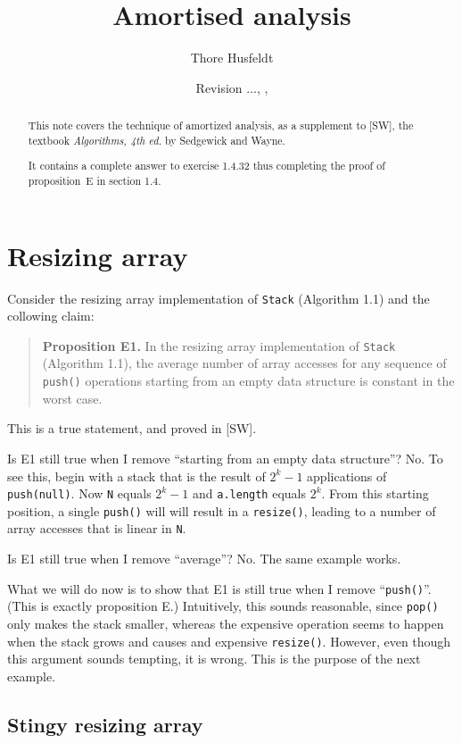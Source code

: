 \documentclass{tufte-handout}
\title{Amortised analysis}
\author{Thore Husfeldt}
\date{\small Revision {\tt \GITAbrHash}$\ldots$, \GITAuthorDate, \GITAuthorName}
\begin{document}
\maketitle
\begin{abstract}
  This note covers the technique of amortized analysis, as a
  supplement to [SW], the textbook \emph{Algorithms, 4th ed.} by
  Sedgewick and Wayne.

  It contains a complete answer to exercise 1.4.32 thus completing the
  proof of proposition~E in section 1.4.
\end{abstract}

\section{Resizing array}
\label{sec-1.1}

Consider the resizing array implementation of {\tt Stack} (Algorithm
1.1) and the collowing claim:

   
\begin{quote} {\bf Proposition E1.} In the resizing array
  implementation of {\tt Stack} (Algorithm 1.1), the average number of
  array accesses for any sequence of {\tt push()} operations starting
  from an empty data structure is constant in the worst case.
\end{quote}

This is a true statement, and proved in [SW].

Is E1 still true when I remove ``starting from an empty data
structure''?
No.
To see this, begin with a stack that is the result of $2^k-1$
applications of {\tt push(null)}. 
Now {\tt N} equals $2^k-1$ and {\tt  a.length} equals $2^k$. 
From this starting position, a single {\tt push()} will will result in
a {\tt resize()}, leading to a  number of array accesses that is
linear in {\tt N}.
   
Is E1 still true when I remove ``average''?
No.
The same example works.
   
What we will do now is to show that E1 is still true when I remove
``{\tt push()}''. 
(This is exactly proposition E.)
Intuitively, this sounds reasonable, since {\tt pop()} only makes the
stack smaller, whereas the expensive operation seems to happen when
the stack grows and causes and expensive {\tt resize()}.
However, even though this argument sounds tempting, it is wrong.
This is the purpose of the next example.
  
\subsection*{Stingy resizing array}
\label{sec-1.2}
\end{document}
